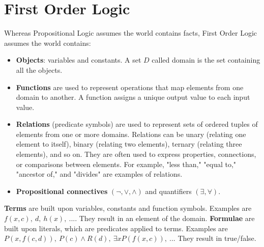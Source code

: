 \documentclass{article}
\begin{document}
\newpage

\section{First Order Logic}

Whereas Propositional Logic assumes the world contains facts, First Order Logic assumes the world contains:
\begin{itemize}
    \item \textbf{Objects}: variables and constants. A set $D$ called domain is the set containing all the objects.
    \item \textbf{Functions} are used to represent operations that map elements from one domain to another. A function assigns a unique output value to each input value.
    \item \textbf{Relations} (predicate symbols) are used to represent sets of ordered tuples of elements from one or more domains. Relations can be unary (relating one element to itself), binary (relating two elements), ternary (relating three elements), and so on. They are often used to express properties, connections, or comparisons between elements. For example, "less than," "equal to," "ancestor of," and "divides" are examples of relations. 
    \item \textbf{Propositional connectives} $(\neg, \lor, \land)$ and quantifiers $(\exists, \forall)$. 
\end{itemize}

\textbf{Terms} are built upon variables, constants and function symbols. Examples are $f(x,c),\ d,\ h(x),\ ...$. They result in an element of the domain.
\textbf{Formulae} are built upon literals, which are predicates applied to terms. Examples are $P(x, f(c,d)),\ P(c) \land R(d),\ \exists x P(f(x,c)),\ ...$ They result in true/false.
\end{document}
